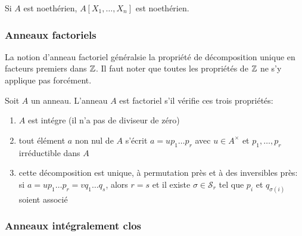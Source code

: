 \begin{corollary}{}{}
    Si $A$ est noethérien, $A[X_1,\dots,X_n]$ est noethérien.
\end{corollary}

\subsubsection{Anneaux factoriels}

La notion d'anneau factoriel généralsie la propriété de décomposition unique en facteurs premiers dans $\mathbb{Z}$.
Il faut noter que toutes les propriétés de $\mathbb{Z}$ ne s'y applique pas forcément. 

\begin{definition}{}{}
    Soit $A$ un anneau. L'anneau $A$ est factoriel s'il vérifie ces trois propriétés:
    \begin{enumerate}[(1)]
        \item $A$ est intégre (il n'a pas de diviseur de zéro)
        \item tout élément $a$ non nul de $A$ s'écrit $a = u p_1 \dots p_r$ avec $u \in A^\times$
              et $p_1, \dots, p_r$ irréductible dans $A$
        \item cette décomposition est unique, à permutation près et à des inversibles près:
              si $a = u p_1 \dots p_r = v q_1 \dots q_s$, alors $r = s$ 
              et il existe $\sigma \in \mathscr{S}_r$ tel que $p_i$ et $q_{\sigma(i)}$ soient associé
    \end{enumerate}
\end{definition}

\subsubsection{Anneaux intégralement clos}